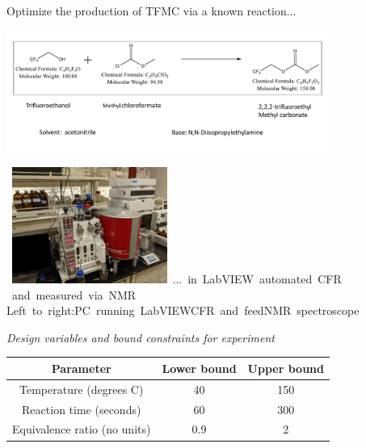 \documentclass[a0paper,landscape]{baposter}
\begin{document}
\begin{poster}
{  \begin{center}

  {\small
  Optimize the production of TFMC via a known reaction...}

  \vskip -4pt

  \includegraphics[width=0.8\textwidth]{../img/probs/basic_reaction.pdf}

  \vskip -4pt
  {\small

  \hbox{
   \hskip -70pt
    \vbox{\includegraphics[width=0.38\textwidth]{../img/probs/cfr-nmr-setup.jpg}}
    \hskip -170pt
   \vbox{... in LabVIEW automated CFR\\
    $\quad$ and measured via NMR\\
    $\quad$\\
    Left to right:\\
    PC running LabVIEW\\
    CFR and feed\\
    NMR spectroscope\\}
    }

  }

  \bigskip

  {\small
  {\sl Design variables and bound constraints for experiment}

  \smallskip

      \begin{tabular}{c|cc}
      Parameter & Lower bound & Upper bound \\
      \hline
       Temperature (degrees C) & 40 & 150 \\
       Reaction time (seconds) & 60 & 300 \\
       Equivalence ratio (no units) & 0.9 & 2 \\
  \end{tabular}
  }
  \end{center}
}


\end{poster}
\end{document}
